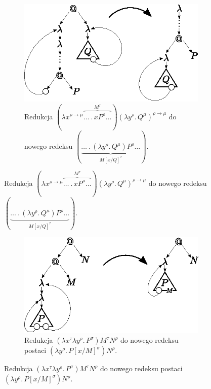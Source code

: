 \begin{dowod}
  \begin{figure}[htb]
  \centering
  \begin{subfigure}{0.55\textwidth}
    \includegraphics[width=1\linewidth]{../reduction1}
    \caption{Redukcja \((\lambda x^{\rho\to\mu}\overbrace{\dots\ .\,x P^\rho \dots}^{M^\tau})(\lambda y^\rho.\, Q^\mu)^{\rho\to\mu}\) do nowego redeksu \((\underbrace{\dots\ .\,(\lambda y^\rho.\,Q^\mu)P^\rho\dots}_{M[x/Q]^\tau})\).}
  \end{subfigure}


\end{figure}
\begin{figure}[htb]\ContinuedFloat
  \centering
  \vspace{1em}
  \begin{subfigure}{0.55\textwidth}
    \includegraphics[width=1\linewidth]{../reduction2b}
    \caption{Redukcja \((\lambda x^\tau \lambda y^\rho.\,P^\sigma)M^\tau N^\rho\) do nowego redeksu postaci \((\lambda y^\rho .\, P[x/M]^\sigma)N^\rho\).}
  \end{subfigure}



\end{figure}
\end{dowod}
